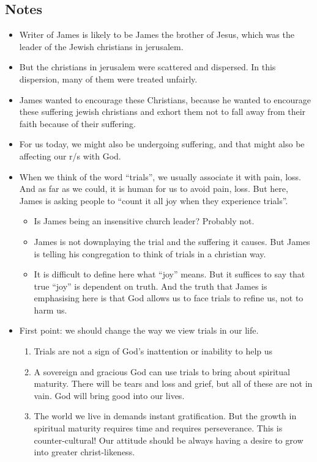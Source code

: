 \subsection*{Notes}
\begin{itemize}
  \item{Writer of James is likely to be James the brother of Jesus, which was the leader of the Jewish christians in jerusalem.}
  \item{But the christians in jerusalem were scattered and dispersed. In this dispersion, many of them were treated unfairly.}
  \item{James wanted to encourage these Christians, because he wanted to encourage these suffering jewish christians and exhort them not to fall away from their faith because of their suffering.}
  \item{For us today, we might also be undergoing suffering, and that might also be affecting our r/s with God. }
  \item{When we think of the word “trials”, we usually associate it with pain, loss. And as far as we could, it is human for us to avoid pain, loss. But here, James is asking people to “count it all joy when they experience trials”.
  \begin{itemize}
    \item{Is James being an insensitive church leader? Probably not.}
    \item{ James is not downplaying the trial and the suffering it causes.
    But James is telling his congregation to think of trials in a christian
    way.}
    \item{It is difficult to define here what “joy” means. But it suffices to
    say that true “joy” is dependent on truth. And the truth that James is
    emphasising here is that God allows us to face trials to refine us, not
    to harm us.}
  \end{itemize}}
  \item{First point: we should change the way we view trials in our life. 
  \begin{enumerate}
    \item Trials are not a sign of God’s inattention or inability to help us
    \item A sovereign and gracious God can use trials to bring about spiritual maturity. There will be tears and loss and grief, but all of these are not in vain. God will bring good into our lives.
    \item The world we live in demands instant gratification. But the growth in spiritual maturity requires time and requires perseverance. This is counter-cultural! Our attitude should be always having a desire to grow into greater christ-likeness.

\end{enumerate}}
\end{itemize}
